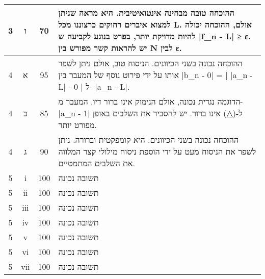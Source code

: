 \documentclass{article}
\begin{document}
\begin{RTL}
\begin{tabular}{|c|c|c|p{10cm}|}
3 & ו & 70 & ההוכחה טובה מבחינה אינטואיטיבית.  היא מראה שניתן למצוא איברים רחוקים כרצוננו מכל L.  אולם,  ההוכחה יכולה להיות מדויקת יותר,  בפרט בנוגע לקביעה ש |f\_n - L| ≥ ε. יש להראות קשר מפורש בין N לבין ε. \\ \hline
4 & א & 95 & ההוכחה נכונה בשני הכיוונים.  הניסוח טוב,  אולם ניתן לשפר אותו  על ידי פירוט נוסף של  המעבר בין |b\_n - 0| = | |a\_n - L| - 0 |  ל- |a\_n - L|. \\ \hline
4 & ב & 85 & הדוגמה נגדית נכונה,  אולם  הנימוק  אינו ברור דיו.  המעבר מ-|a\_n - 1| ל-(△) אינו ברור.  יש להסביר את השלבים באופן מפורט יותר. \\ \hline
4 & ג & 90 & ההוכחה נכונה בשני הכיוונים.  היא קומפקטית וברורה.  ניתן לשפר את הניסוח מעט על ידי הוספת ניסוח מילולי קצר המלווה את השלבים המתמטיים. \\ \hline
5 & i & 100 & תשובה נכונה \\ \hline
5 & ii & 100 & תשובה נכונה \\ \hline
5 & iii & 100 & תשובה נכונה \\ \hline
5 & iv & 100 & תשובה נכונה \\ \hline
5 & v & 100 & תשובה נכונה \\ \hline
5 & vi & 100 & תשובה נכונה \\ \hline
5 & vii & 100 & תשובה נכונה \\ \hline
\end{tabular}
\end{RTL}
\end{document}
